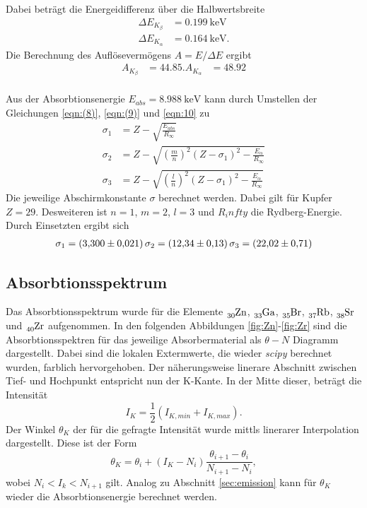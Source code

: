 Dabei beträgt die Energeidifferenz über die Halbwertsbreite
\begin{align*}
    \Delta E_{K_\beta}  &= \SI{0.199}{\kilo\electronvolt}\\
    \Delta E_{K_\alpha} &= \SI{0.164}{\kilo\electronvolt}   .
\end{align*}
Die Berechnung des Auflösevermögens $A=E/\Delta E$ ergibt
\begin{align*}
    A_{K_\beta}  &= \num{44.85} .
    A_{K_\alpha} &= \num{48.92} \\
\end{align*}

Aus der Absorbtionsenergie $E_{abs}=\SI{8.988}{\kilo\electronvolt}$ \cite{AP04} kann durch Umstellen der Gleichungen \eqref{eqn:(8)},
\eqref{eqn:(9)} und \eqref{eqn:10} zu 
\begin{align*}
    \sigma_1&=Z-\sqrt{\frac{E_{abs}}{R_\infty}}\\
    \sigma_2&=Z-\sqrt{\left(\frac{m}{n}\right)^2(Z-\sigma_1)^2-\frac{E_\alpha}{R_\infty}}\\
    \sigma_3&=Z-\sqrt{\left(\frac{l}{n}\right)^2(Z-\sigma_1)^2-\frac{E_\alpha}{R_\infty}}
\end{align*}
Die jeweilige Abschirmkonstante $\sigma$ berechnet werden. Dabei gilt für Kupfer $Z=\num{29}$. Desweiteren ist $n=1$, $m=2$, $l=3$
und $R_infty$ die Rydberg-Energie. Durch Einsetzten ergibt sich
\begin{align*}
    \sigma_1=\SI{3.30  \pm 0.021}
    \sigma_2=\SI{12.34 \pm 0.13 }
    \sigma_3=\SI{22.02 \pm 0.71 }   .
\end{align*}

\subsection{Absorbtionsspektrum}
\label{sec:absorb}
Das Absorbtionsspektrum wurde für die Elemente $\ce{_{30}Zn}$, $\ce{_{33}Ga}$, $\ce{_{35}Br}$, $\ce{_{37}Rb}$, $\ce{_{38}Sr}$ und 
$\ce{_{40}Zr}$ aufgenommen. In den folgenden Abbildungen \ref{fig:Zn}-\ref{fig:Zr} sind die Absorbtionsspektren für das jeweilige
Absorbermaterial als $\theta-N$ Diagramm dargestellt. Dabei sind die lokalen Extermwerte, die wieder \textit{scipy} \cite{scipy}
berechnet wurden, farblich hervorgehoben. Der näherungsweise linerare Abschnitt zwischen Tief- und Hochpunkt entspricht nun der 
K-Kante. In der Mitte dieser, beträgt die Intensität
\begin{equation*}
    I_K=\frac{1}{2}(I_{K,min}+I_{K,max})   .
\end{equation*}
Der Winkel $\theta_K$ der für die gefragte Intensität wurde mittls linerarer Interpolation dargestellt. Diese ist der Form 
\begin{equation*}
    \theta_K=\theta_i+(I_K-N_i)\frac{\theta_{i+1}-\theta_i}{N_{i+1}-N_i},
\end{equation*}
wobei $N_i<I_k<N_{i+1}$ gilt. Analog zu Abschnitt \ref{sec:emission} kann für $\theta_K$ wieder die Absorbtionsenergie berechnet werden. 

